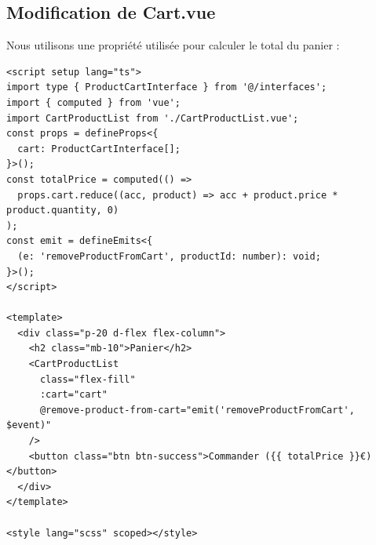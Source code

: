 \subsection{Modification de {\color{monOrange}Cart.vue}}
Nous utilisons une propriété utilisée pour calculer le total du panier :
\begin{verbatim}
<script setup lang="ts">
import type { ProductCartInterface } from '@/interfaces';
import { computed } from 'vue';
import CartProductList from './CartProductList.vue';
const props = defineProps<{
  cart: ProductCartInterface[];
}>();
const totalPrice = computed(() =>
  props.cart.reduce((acc, product) => acc + product.price * product.quantity, 0)
);
const emit = defineEmits<{
  (e: 'removeProductFromCart', productId: number): void;
}>();
</script>

<template>
  <div class="p-20 d-flex flex-column">
    <h2 class="mb-10">Panier</h2>
    <CartProductList
      class="flex-fill"
      :cart="cart"
      @remove-product-from-cart="emit('removeProductFromCart', $event)"
    />
    <button class="btn btn-success">Commander ({{ totalPrice }}€)</button>
  </div>
</template>

<style lang="scss" scoped></style>
\end{verbatim} 
